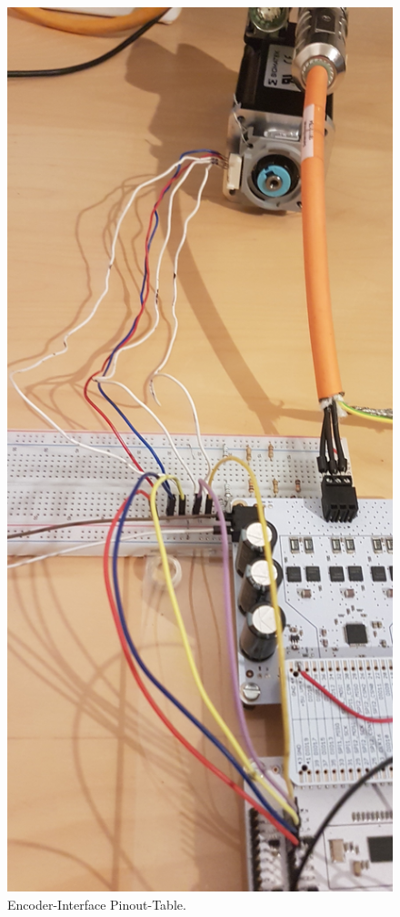 \begin{appendix}
\begin{figure}[h!]
	\centering
	\includegraphics[angle = 270, width=\textwidth]{graphics/4_Antriebskette}
	\caption{Encoder-Interface Pinout-Table.}
	\label{fig:4_Antriebskette}
\end{figure}


\end{appendix}
